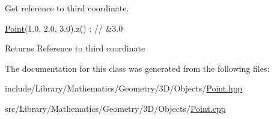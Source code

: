 Get reference to third coordinate. 


\begin{DoxyCode}
\hyperlink{classlibrary_1_1math_1_1geom_1_1d3_1_1objects_1_1_point_a617e690ab6091af3de729cee337e309e}{Point}(1.0, 2.0, 3.0).z() ; \textcolor{comment}{// &3.0}
\end{DoxyCode}


\begin{DoxyReturn}{Returns}
Reference to third coordinate 
\end{DoxyReturn}


The documentation for this class was generated from the following files\+:\begin{DoxyCompactItemize}
\item 
include/\+Library/\+Mathematics/\+Geometry/3\+D/\+Objects/\hyperlink{3_d_2_objects_2_point_8hpp}{Point.\+hpp}\item 
src/\+Library/\+Mathematics/\+Geometry/3\+D/\+Objects/\hyperlink{3_d_2_objects_2_point_8cpp}{Point.\+cpp}\end{DoxyCompactItemize}
